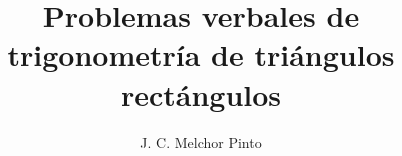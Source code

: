 \documentclass[12pt]{guia}
\title{Problemas verbales de trigonometría de triángulos rectángulos}
\author{J. C. Melchor Pinto}
\begin{document}
\pagestyle{headandfoot}
\addpoints
\INFO
\printanswers
\vspace{-0.9cm}
\begin{multicols}{2}
    \columnbreak
\end{multicols}
%
% 
% 
\begin{questions}
    \questionboxed[10]{}
    \questionboxed[10]{}
    \questionboxed[10]{}
    \questionboxed[10]{}
    \questionboxed[10]{}
    \questionboxed[10]{}
    \questionboxed[10]{}
\end{questions}
\end{document}
